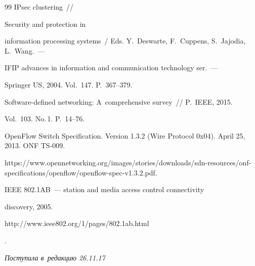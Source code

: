 {{\begin{thebibliography}{99}
 IPsec clustering~/\!\!/ 


Security and protection in 


information processing systems~/ Eds. Y.~Deswarte, F.~Cuppens, S.~Jajodia, L.~Wang.~---


IFIP advances in information and communication technology ser.~---


Springer US, 2004. Vol.~147. P.~367--379.






Software-defined networking: A~comprehensive survey~/\!\!/ P.~IEEE, 2015. 


Vol.~103. No.\,1. P.~14--76.




OpenFlow Switch Specification. Version 1.3.2 (Wire Protocol 0x04). April 25, 2013. ONF TS-009. 


{\sf https://www.opennetworking.org/images/stories/downloads/sdn-resources/onf-specifications/openflow/openflow-spec-v1.3.2.pdf}.




 IEEE 802.1AB~--- station and media access control connectivity


  discovery, 2005.  {\sf 


http://www.ieee802.org/1/pages/802.1ab.html}.





        \end{thebibliography}


} }








\vspace*{-3pt}





\hfill{\small\textit{Поступила в~редакцию 26.11.17}}














\vspace*{8pt}





